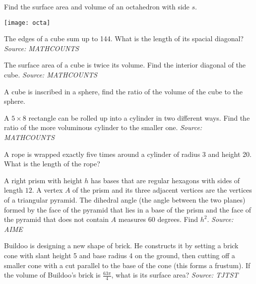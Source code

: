 \begin{problem}
Find the surface area and volume of an octahedron with side $s$.
\begin{center}
\texttt{[image: octa]}
\end{center}
\end{problem}

\begin{problem}
The edges of a cube sum up to 144. What is the length of its spacial diagonal? \textit{Source: MATHCOUNTS}
\end{problem}

\begin{problem}
The surface area of a cube is twice its volume. Find the interior diagonal of the cube. \textit{Source: MATHCOUNTS}
\end{problem}

\begin{problem}
A cube is inscribed in a sphere, find the ratio of the volume of the cube to the sphere.
\end{problem}

\begin{problem}
A $5\times 8$ rectangle can be rolled up into a cylinder in two different ways. Find the ratio of the more voluminous cylinder to the smaller one. \textit{Source: MATHCOUNTS}
\end{problem}

\begin{problem}
A rope is wrapped exactly five times around a cylinder of radius 3 and height 20. What is the length of the rope?
\end{problem}

\begin{problem}
A right prism with height $h$ has bases that are regular hexagons with sides of length $12$. A vertex $A$ of the prism and its three adjacent vertices are the vertices of a triangular pyramid. The dihedral angle (the angle between the two planes) formed by the face of the pyramid that lies in a base of the prism and the face of the pyramid that does not contain $A$ measures $60$ degrees. Find $h^2$. \textit{Source: AIME}
\end{problem}

\begin{problem}
Buildoo is designing a new shape of brick. He constructs it by setting a brick cone with slant height 5 and base radius 4 on the ground, then cutting off a smaller cone with a cut parallel to the base of the cone (this forms a frustum). If the volume of Buildoo’s brick is $\frac{63\pi}{4}$, what is its surface area? \textit{Source: TJTST}
\end{problem}


